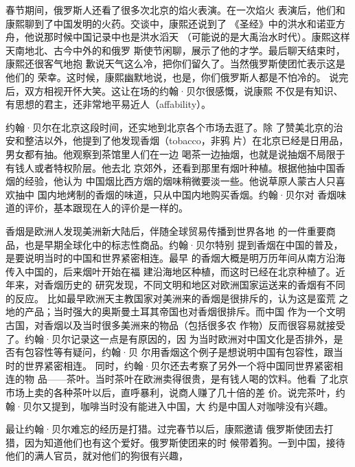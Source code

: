 \par
春节期间，俄罗斯人还看了很多次北京的焰火表演。在一次焰火%
表演后，他们和康熙聊到了中国发明的火药。交谈中，康熙还说到了%
《圣经》中的洪水和诺亚方舟，他说那时候中国记录中也是洪水滔天%
（可能说的是大禹治水时代）。康熙这样天南地北、古今中外的和俄罗%
斯使节闲聊，展示了他的才学。最后聊天结束时，康熙还很客气地抱%
歉说天气这么冷，把你们留久了。当然俄罗斯使团忙表示这是他们的%
荣幸。这时候，康熙幽默地说，也是，你们俄罗斯人都是不怕冷的。%
说完后，双方相视开怀大笑。这让在场的约翰·贝尔很感慨，说康熙%
不仅是有知识、有思想的君主，还非常地平易近人（affability）。%
\par
约翰·贝尔在北京这段时间，还实地到北京各个市场去逛了。除%
了赞美北京的治安和整洁以外，他提到了他发现香烟（tobacco，非鸦%
片）在北京已经是日用品，男女都有抽。他观察到茶馆里人们在一边%
喝茶一边抽烟，也就是说抽烟不局限于有钱人或者特权阶层。他去北%
京郊外，还看到那里有烟叶种植。根据他抽中国香烟的经验，他认为%
中国烟比西方烟的烟味稍微要淡一些。他说草原人蒙古人只喜欢抽中%
国内地烤制的香烟的味道，只从中国内地购买香烟。约翰·贝尔对%
香烟味道的评价，基本跟现在人的评价是一样的。%
\par
香烟是欧洲人发现美洲新大陆后，伴随全球贸易传播到世界各地%
的一件重要商品，也是早期全球化中的标志性商品。约翰·贝尔特别%
提到香烟在中国的普及，是要说明当时的中国和世界紧密相连。最早%
的香烟大概是明万历年间从南方沿海传入中国的，后来烟叶开始在福%
建沿海地区种植，而这时已经在北京种植了。近年来，对香烟历史的%
研究发现，不同文明和地区对欧洲国家运送来的香烟有不同的反应。%
比如最早欧洲天主教国家对美洲来的香烟是很排斥的，认为这是蛮荒%
之地的产品；当时强大的奥斯曼土耳其帝国也对香烟很排斥。而中国%
作为一个文明古国，对香烟以及当时很多美洲来的物品（包括很多农%
作物）反而很容易就接受了。约翰·贝尔记录这一点是有原因的，因%
为当时欧洲对中国文化是否排外，是否有包容性等有疑问，约翰·贝%
尔用香烟这个例子是想说明中国有包容性，跟当时的世界紧密相连。%
同时，约翰·贝尔还去考察了另外一个将中国同世界紧密相连的物%
品——茶叶。当时茶叶在欧洲卖得很贵，是有钱人喝的饮料。他看%
了北京市场上卖的各种茶叶以后，直呼暴利，说商人赚了几十倍的差%
价。说完茶叶，约翰·贝尔又提到，咖啡当时没有能进入中国，大%
约是中国人对咖啡没有兴趣。%
\par
最让约翰·贝尔难忘的经历是打猎。过完春节以后，康熙邀请%
俄罗斯使团去打猎，因为知道他们也有这个爱好。俄罗斯使团来的时%
候带着狗。一到中国，接待他们的满人官员，就对他们的狗很有兴趣，%
